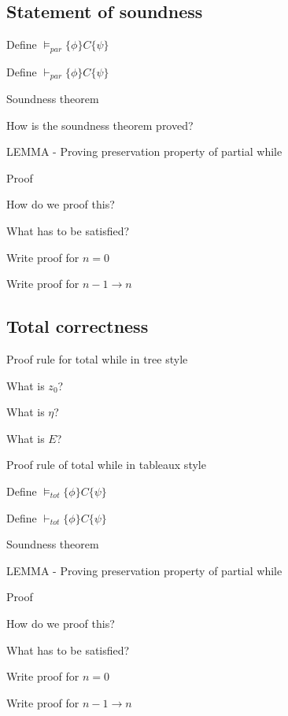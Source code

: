 \documentclass[fleqn]{article}
\begin{document}
\subsection{Statement of soundness}
\begin{enumerate}
    {\color{blue}\item Define $\models_{par} \{ \phi \} C \{ \psi \}$}
    \item Define $\vdash_{par} \{ \phi \} C \{ \psi \}$
    {\color{red}\item Soundness theorem}
    \item How is the soundness theorem proved?
    \item LEMMA - Proving preservation property of partial while
    \item Proof
    \begin{itemize}
        \item How do we proof this?
        {\color{blue}\item What has to be satisfied?}
        \item Write proof for $n=0$
        \item Write proof for $n - 1 \rightarrow n$
    \end{itemize}
\end{enumerate}

\subsection{Total correctness}
\begin{enumerate}
    {\color{red}\item Proof rule for total while in tree style}
    \begin{itemize}
        \item What is $z_0$?
        {\color{red}\item What is $\eta$?}
        {\color{red}\item What is $E$?}
    \end{itemize}
    \item Proof rule of total while in tableaux style
    \item Define $\models_{tot} \{ \phi \} C \{ \psi \}$
    \item Define $\vdash_{tot} \{ \phi \} C \{ \psi \}$
    {\color{red}\item Soundness theorem}
    \item LEMMA - Proving preservation property of partial while
    \item Proof
    \begin{itemize}
        \item How do we proof this?
        {\color{red}\item What has to be satisfied?}
        \item Write proof for $n=0$
        {\color{blue}\item Write proof for $n - 1 \rightarrow n$}
    \end{itemize}
\end{enumerate}
\end{document}
